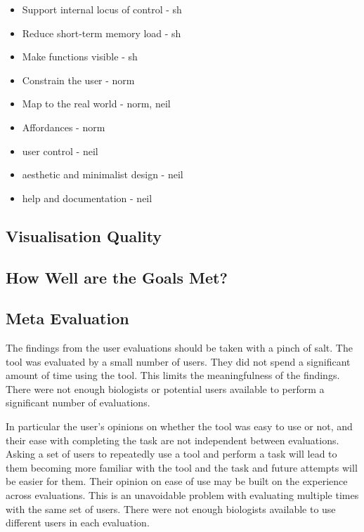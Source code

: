 \begin{itemize}
\item Support internal locus of control - sh
\item Reduce short-term memory load - sh
\item Make functions visible - sh
\item Constrain the user - norm
\item Map to the real world - norm, neil
\item Affordances - norm
\item user control - neil
\item aesthetic and minimalist design - neil
\item help and documentation - neil
\end{itemize}

\subsection{Visualisation Quality}


\subsection{How Well are the Goals Met?}




\subsection{Meta Evaluation}
The findings from the user evaluations should be taken with a pinch of salt.  The tool was evaluated by a small number of users.  They did not spend a significant amount of time using the tool.  This limits the meaningfulness of the findings.  There were not enough biologists or potential users available to perform a significant number of evaluations.

In particular the user's opinions on whether the tool was easy to use or not, and their ease with completing the task are not independent between evaluations.  Asking a set of users to repeatedly use a tool and perform a task will lead to them becoming more familiar with the tool and the task and future attempts will be easier for them.  Their opinion on ease of use may be built on the experience across evaluations.  This is an unavoidable problem with evaluating multiple times with the same set of users.  There were not enough biologists available to use different users in each evaluation.

